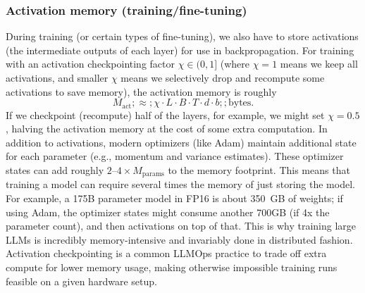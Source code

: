 \subsubsection{Activation memory (training/fine-tuning)}
During training (or certain types of fine-tuning), we also have to store activations (the intermediate outputs of each layer) for use in backpropagation. For training with an activation checkpointing factor $\chi \in (0,1]$ (where $\chi=1$ means we keep all activations, and smaller $\chi$ means we selectively drop and recompute some activations to save memory), the activation memory is roughly
\begin{equation}
\label{eq:act-mem}
M_{\text{act}} ;\approx; \chi \cdot L \cdot B \cdot T \cdot d \cdot b ;; \text{bytes}.
\end{equation}
If we checkpoint (recompute) half of the layers, for example, we might set $\chi=0.5$, halving the activation memory at the cost of some extra computation. In addition to activations, modern optimizers (like Adam) maintain additional state for each parameter (e.g., momentum and variance estimates). These optimizer states can add roughly $2$--$4\times M_{\text{params}}$ to the memory footprint. This means that training a model can require several times the memory of just storing the model. For example, a 175B parameter model in FP16 is about 350~GB of weights; if using Adam, the optimizer states might consume another 700GB (if 4x the parameter count), and then activations on top of that. This is why training large LLMs is incredibly memory-intensive and invariably done in distributed fashion. Activation checkpointing is a common LLMOps practice to trade off extra compute for lower memory usage, making otherwise impossible training runs feasible on a given hardware setup.


